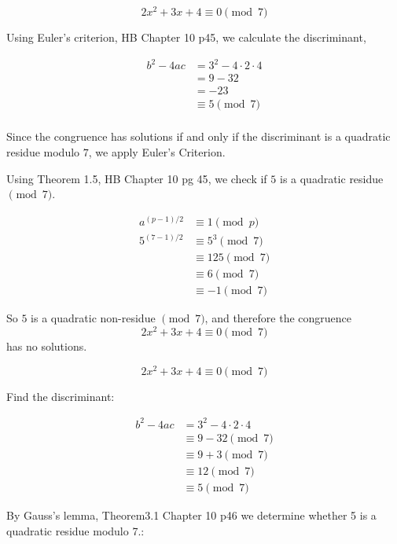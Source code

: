 \documentclass{tufte-handout}
\begin{document}
\begin{question}

\[ 2x^{2} + 3x +4 \equiv 0 \pmod{7} \]

\qpart

\qsubpart

Using Euler's criterion, \textup{HB Chapter 10 p45}, we calculate the discriminant,

\begin{align*}
b^{2} - 4ac &= 3^{2} - 4 \cdot 2 \cdot 4 \\[8pt]
&= 9 - 32 \\[8pt]
&= -23 \\[8pt]
&\equiv 5 \pmod{7} \\[8pt]
\end{align*}


Since the congruence has solutions if and only if the discriminant is a quadratic residue modulo \( 7 \), 
we apply Euler’s Criterion.

Using \textup{Theorem 1.5, HB Chapter 10 pg 45}, we check if \( 5 \) is a quadratic residue \( \pmod{7} \).

\begin{align*}
a^{(p-1)/2} &\equiv 1 \pmod{p} \\[8pt]
5^{(7-1)/2} &\equiv 5^{3} \pmod{7} \\[8pt]
&\equiv 125 \pmod{7} \\[8pt]
&\equiv 6 \pmod{7} \\[8pt]
&\equiv -1 \pmod{7}
\end{align*}

So \( 5 \) is a quadratic non-residue \( \pmod{7} \), and therefore the congruence
\[ 2x^{2} + 3x + 4 \equiv 0 \pmod{7} \]
has no solutions.

\vspace{3cm}

\qsubpart

\[ 2x^{2} + 3x + 4 \equiv 0 \pmod{7} \]

Find the discriminant:

\begin{align*}
b^2 - 4ac &= 3^2 - 4 \cdot 2 \cdot 4 \\
    &\equiv 9 - 32 \pmod{7} \\
    &\equiv 9 + 3 \pmod{7} \\
    &\equiv 12 \pmod{7} \\
    &\equiv 5 \pmod{7} 
\end{align*}

By Gauss's lemma, \textup{Theorem3.1 Chapter 10 p46} we determine whether 5 is a quadratic residue modulo 7.:


\end{question}
\end{document}

